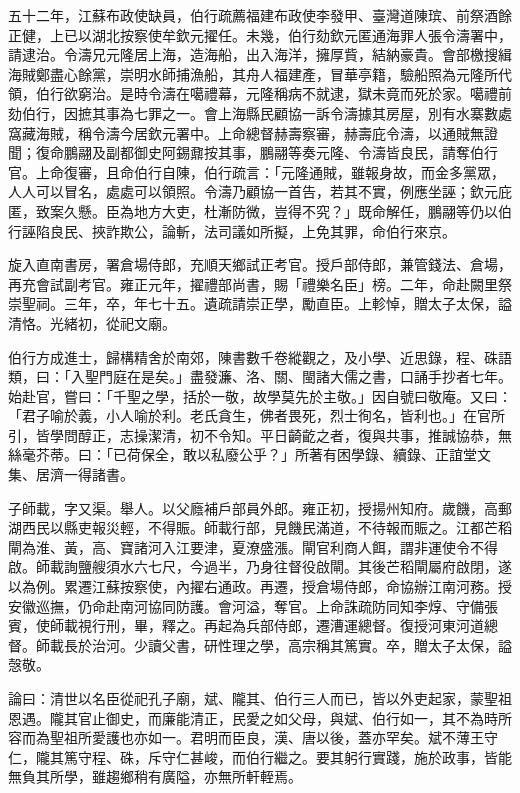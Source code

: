 \begin{pinyinscope}
五十二年，江蘇布政使缺員，伯行疏薦福建布政使李發甲、臺灣道陳瑸、前祭酒餘正健，上已以湖北按察使牟欽元擢任。未幾，伯行劾欽元匿通海罪人張令濤署中，請逮治。令濤兄元隆居上海，造海船，出入海洋，擁厚貲，結納豪貴。會部檄搜緝海賊鄭盡心餘黨，崇明水師捕漁船，其舟人福建產，冒華亭籍，驗船照為元隆所代領，伯行欲窮治。是時令濤在噶禮幕，元隆稱病不就逮，獄未竟而死於家。噶禮前劾伯行，因摭其事為七罪之一。會上海縣民顧協一訴令濤據其房屋，別有水寨數處窩藏海賊，稱令濤今居欽元署中。上命總督赫壽察審，赫壽庇令濤，以通賊無證聞；復命鵬翮及副都御史阿錫鼐按其事，鵬翮等奏元隆、令濤皆良民，請奪伯行官。上命復審，且命伯行自陳，伯行疏言：「元隆通賊，雖報身故，而金多黨眾，人人可以冒名，處處可以領照。令濤乃顧協一首告，若其不實，例應坐誣；欽元庇匿，致案久懸。臣為地方大吏，杜漸防微，豈得不究？」既命解任，鵬翮等仍以伯行誣陷良民、挾詐欺公，論斬，法司議如所擬，上免其罪，命伯行來京。

旋入直南書房，署倉場侍郎，充順天鄉試正考官。授戶部侍郎，兼管錢法、倉場，再充會試副考官。雍正元年，擢禮部尚書，賜「禮樂名臣」榜。二年，命赴闕里祭崇聖祠。三年，卒，年七十五。遺疏請崇正學，勵直臣。上軫悼，贈太子太保，謚清恪。光緒初，從祀文廟。

伯行方成進士，歸構精舍於南郊，陳書數千卷縱觀之，及小學、近思錄，程、硃語類，曰：「入聖門庭在是矣。」盡發濂、洛、關、閩諸大儒之書，口誦手抄者七年。始赴官，嘗曰：「千聖之學，括於一敬，故學莫先於主敬。」因自號曰敬庵。又曰：「君子喻於義，小人喻於利。老氏貪生，佛者畏死，烈士徇名，皆利也。」在官所引，皆學問醇正，志操潔清，初不令知。平日齮齕之者，復與共事，推誠協恭，無絲毫芥蒂。曰：「已荷保全，敢以私廢公乎？」所著有困學錄、續錄、正誼堂文集、居濟一得諸書。

子師載，字又渠。舉人。以父廕補戶部員外郎。雍正初，授揚州知府。歲饑，高郵湖西民以縣吏報災輕，不得賑。師載行部，見饑民滿道，不待報而賑之。江都芒稻閘為淮、黃，高、寶諸河入江要津，夏潦盛漲。閘官利商人餌，謂非運使令不得啟。師載詢鹽艘須水六七尺，今過半，乃身往督役啟閘。其後芒稻閘屬府啟閉，遂以為例。累遷江蘇按察使，內擢右通政。再遷，授倉場侍郎，命協辦江南河務。授安徽巡撫，仍命赴南河協同防護。會河溢，奪官。上命誅疏防同知李焞、守備張賓，使師載視行刑，畢，釋之。再起為兵部侍郎，遷漕運總督。復授河東河道總督。師載長於治河。少讀父書，研性理之學，高宗稱其篤實。卒，贈太子太保，謚愨敬。

論曰：清世以名臣從祀孔子廟，斌、隴其、伯行三人而已，皆以外吏起家，蒙聖祖恩遇。隴其官止御史，而廉能清正，民愛之如父母，與斌、伯行如一，其不為時所容而為聖祖所愛護也亦如一。君明而臣良，漢、唐以後，蓋亦罕矣。斌不薄王守仁，隴其篤守程、硃，斥守仁甚峻，而伯行繼之。要其躬行實踐，施於政事，皆能無負其所學，雖趨鄉稍有廣隘，亦無所軒輊焉。


\end{pinyinscope}